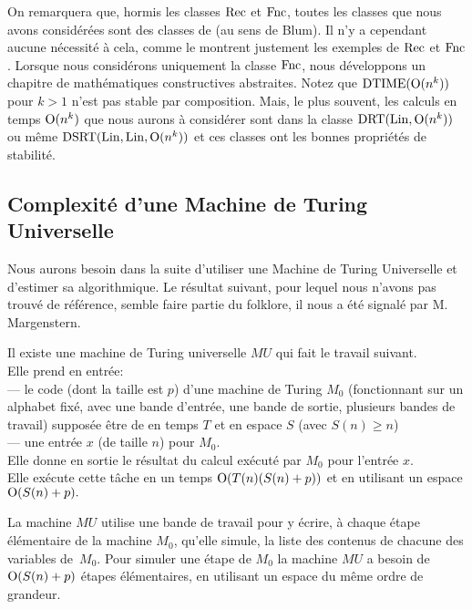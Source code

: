 \smallskip On remarquera que, hormis les classes ${\rm Rec}$  et ${\rm Fnc}$, toutes les classes que nous avons considérées sont des classes de \com (au sens de Blum). 
Il n'y a cependant aucune nécessité à cela, comme le montrent justement les exemples de ${\rm Rec}$  et ${\rm Fnc}$. 
Lorsque nous considérons uniquement la classe ${\rm Fnc}$, nous développons un chapitre de mathématiques constructives abstraites.
Notez que ${\rm DTIME} ({\rm O}(n^k))$ pour $k > 1$ n'est pas stable par composition. Mais, le plus souvent, les calculs en temps ${\rm O}(n^k)$ que nous aurons à considérer sont dans la classe ${\rm DRT}({\rm Lin}, {\rm O}(n^k))$  ou même ${\rm DSRT}({\rm Lin}, {\rm Lin}, {\rm O}(n^k))$  et ces classes ont les bonnes propriétés de stabilité.

\subsection{Complexité d'une Machine de Turing Universelle}\label{fsubsec13} 
Nous aurons besoin dans la suite d'utiliser une Machine de Turing Universelle et d'estimer sa \com algorithmique. 
Le résultat suivant, pour lequel nous n'avons pas trouvé de référence, semble faire partie du folklore, il nous a été signalé par M. Margenstern.

\begin{flemma} \label{f131} 
Il existe une machine de Turing universelle $MU$ qui fait le travail suivant.\\
Elle prend en entrée:\\
---  le code  (dont la taille est  $p$)  d'une machine de Turing $M_0$ 
(fonctionnant  sur un alphabet fixé, avec une bande d'entrée, une bande de 
sortie, plusieurs bandes de travail)  supposée être de \com en temps  $T $ 
et en espace  $S$  (avec  $S(n) \geq  n$)\\ 
--- une entrée  $x$   (de taille $n$)  pour $M_0$.\\
Elle donne en sortie le résultat du calcul exécuté par  $M_0$  pour 
l'entrée  $x$.\\
Elle exécute cette tâche en un temps  ${\rm O}(T(n)(S(n)+p))$  et en utilisant un 
espace  ${\rm O}(S(n)+p).$
\end{flemma} 

\proof 
La machine $MU$ utilise une bande de travail pour y écrire, à chaque étape 
élémentaire de la machine $M_0$,  qu'elle simule, la liste des contenus de 
chacune des variables de~$M_0.$ Pour simuler une étape de $M_0$ la machine  
$MU$  a besoin de  ${\rm O}(S(n)+p)$  étapes élémentaires, en utilisant un 
espace du même ordre de grandeur.\eop

